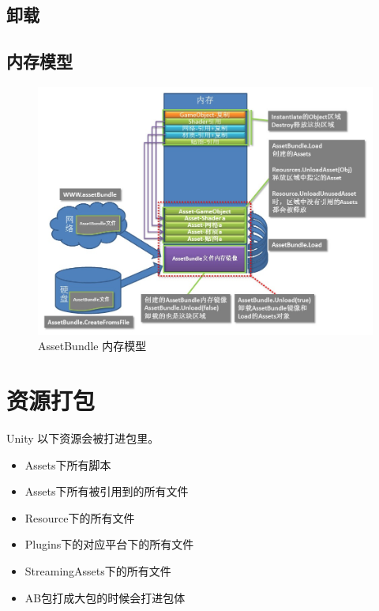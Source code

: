 \documentclass[UTF8,a4paper,12pt]{ctexbook}
\begin{document}
		\subsection{卸载}
		
		\subsection{内存模型}
			\begin{figure}[H]
				\centering
				\includegraphics[scale=0.7]{assetBundel}
				\caption{AssetBundle 内存模型}
		\end{figure}
		
	\section{资源打包}
		Unity  以下资源会被打进包里。
		\begin{itemize}
			\item Assets下所有脚本
			\item Assets下所有被引用到的所有文件
			\item Resource下的所有文件
			\item Plugins下的对应平台下的所有文件
			\item StreamingAssets下的所有文件
			\item AB包打成大包的时候会打进包体
		\end{itemize}
		
\end{document}
